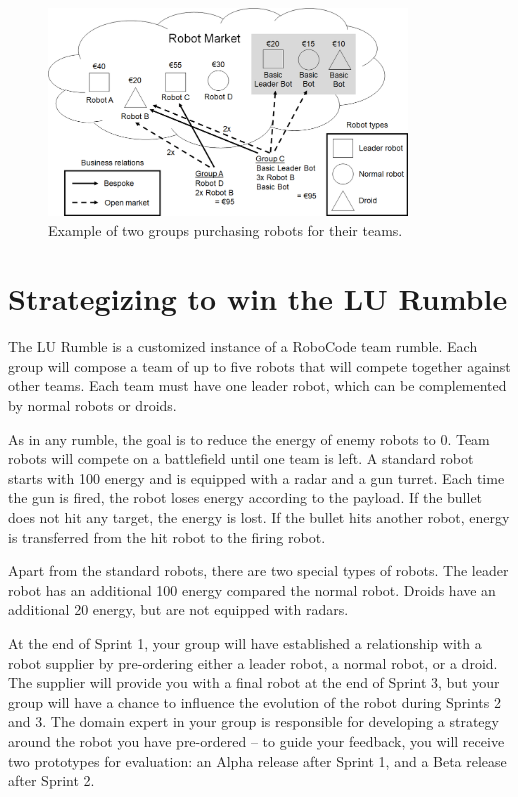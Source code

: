\documentclass{scrreprt}
\begin{document}
\begin{figure}
\centering
\includegraphics[width=0.85\textwidth]{figures/marketExample.png}
\caption{Example of two groups purchasing robots for their teams.}
\label{fig:market}
\end{figure}

\chapter{Strategizing to win the LU Rumble}
The LU Rumble is a customized instance of a RoboCode team rumble. Each group will compose a team of up to five robots that will compete together against other teams. Each team must have one leader robot, which can be complemented by normal robots or droids.

As in any rumble, the goal is to reduce the energy of enemy robots to 0. Team robots will compete on a battlefield until one team is left. A standard robot starts with 100 energy and is equipped with a radar and a gun turret. Each time the gun is fired, the robot loses energy according to the payload. If the bullet does not hit any target, the energy is lost. If the bullet hits another robot, energy is transferred from the hit robot to the firing robot.

Apart from the standard robots, there are two special types of robots. The leader robot has an additional 100 energy compared the normal robot. Droids have an additional 20 energy, but are not equipped with radars.

At the end of Sprint 1, your group will have established a relationship with a robot supplier by pre-ordering either a leader robot, a normal robot, or a droid. The supplier will provide you with a final robot at the end of Sprint 3, but your group will have a chance to influence the evolution of the robot during Sprints 2 and 3. The domain expert in your group is responsible for developing a strategy around the robot you have pre-ordered -- to guide your feedback, you will receive two prototypes for evaluation: an Alpha release after Sprint 1, and a Beta release after Sprint 2.
\end{document}
